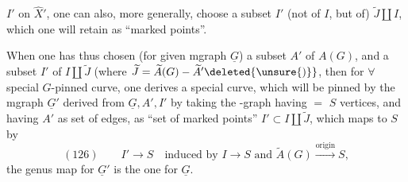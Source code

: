 $I'$ on $\widehat X'$, one can also, more generally, choose a subset $I'$ (not of $I$, but of) $\widetilde J\amalg I$, which one will retain as ``marked points''.

When one has thus chosen (for  given mgraph $\underline G$) a subset $A'$ of $A(G)$, and a subset $I'$ of $I\amalg\widetilde J$ (where $\widetilde J=\widetilde A(G)-\widetilde A'\deleted{\unsure{)}}$, then for $\forall$ special $G$-pinned curve, one derives a special curve, which will be pinned by the mgraph $\underline G'$ derived from $\underline G,A',I'$ by taking the -graph  having $=$ $S$ vertices, and having $A'$ as set of edges,  as ``set of marked points'' $I'\subset I\amalg\widetilde J$, which maps to $S$  by
\[
(126)\qquad I'\longrightarrow S\quad\text{induced by }I\longrightarrow S\text{ and }\widetilde A(G)\xrightarrow{\text{origin}}S,
\]
the genus map for $\underline G'$ is the one for $\underline G$.
